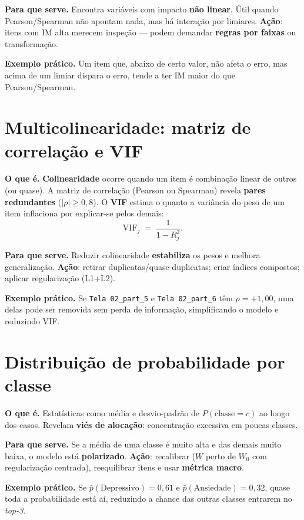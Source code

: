 \documentclass[12pt,a4paper]{article}
\begin{document}
\textbf{Para que serve.} Encontra variáveis com impacto \textbf{não linear}. Útil quando Pearson/Spearman não apontam nada, mas há interação por limiares. \textbf{Ação}: itens com IM alta merecem inspeção — podem demandar \textbf{regras por faixas} ou transformação.

\textbf{Exemplo prático.} Um item que, abaixo de certo valor, não afeta o erro, mas acima de um limiar dispara o erro, tende a ter IM maior do que Pearson/Spearman.

\section{Multicolinearidade: matriz de correlação e VIF}
\textbf{O que é.} \textbf{Colinearidade} ocorre quando um item é combinação linear de outros (ou quase). A matriz de correlação (Pearson ou Spearman) revela \textbf{pares redundantes} ($|\rho|\ge 0{,}8$). O \textbf{VIF} estima o quanto a variância do peso de um item inflaciona por explicar-se pelos demais:
\begin{equation}
\mathrm{VIF}_j \;=\; \frac{1}{1 - R_j^2}.
\end{equation}

\textbf{Para que serve.} Reduzir colinearidade \textbf{estabiliza} os pesos e melhora generalização. \textbf{Ação}: retirar duplicatas/quase-duplicatas; criar índices compostos; aplicar regularização (L1+L2).

\textbf{Exemplo prático.} Se \texttt{Tela 02\_part\_5} e \texttt{Tela 02\_part\_6} têm $\rho=+1{,}00$, uma delas pode ser removida sem perda de informação, simplificando o modelo e reduzindo VIF.

\section{Distribuição de probabilidade por classe}
\textbf{O que é.} Estatísticas como média e desvio-padrão de $P(\text{classe}=c)$ ao longo dos casos. Revelam \textbf{viés de alocação}: concentração excessiva em poucas classes.

\textbf{Para que serve.} Se a média de uma classe é muito alta e das demais muito baixa, o modelo está \textbf{polarizado}. \textbf{Ação}: recalibrar ($W$ perto de $W_0$ com regularização centrada), reequilibrar itens e usar \textbf{métrica macro}.

\textbf{Exemplo prático.} Se $\bar{p}(\text{Depressivo})=0{,}61$ e $\bar{p}(\text{Ansiedade})=0{,}32$, quase toda a probabilidade está aí, reduzindo a chance das outras classes entrarem no \emph{top-3}.
\end{document}
